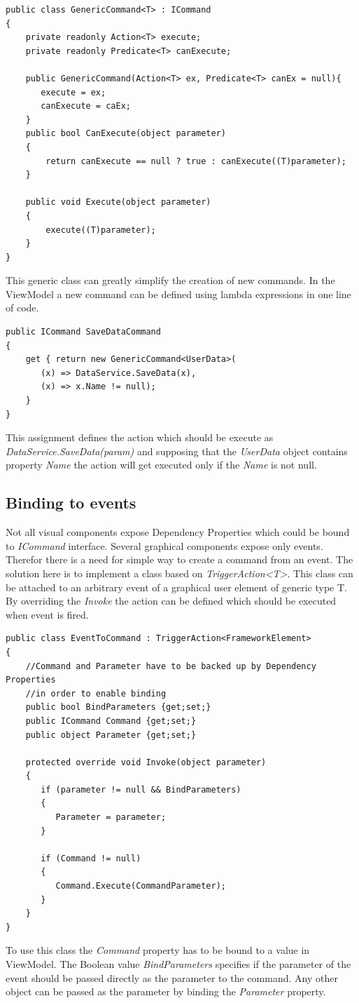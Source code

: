 \begin{verbatim}
public class GenericCommand<T> : ICommand
{
    private readonly Action<T> execute;
    private readonly Predicate<T> canExecute;
    
    public GenericCommand(Action<T> ex, Predicate<T> canEx = null){
       execute = ex;
       canExecute = caEx;
    }
    public bool CanExecute(object parameter)
    {
        return canExecute == null ? true : canExecute((T)parameter);
    }
    
    public void Execute(object parameter)
    {
        execute((T)parameter);
    }
}
\end{verbatim}
This generic class can greatly simplify the creation of new commands. In the ViewModel a new command can be defined using lambda expressions in one line of code.

\begin{verbatim}
public ICommand SaveDataCommand
{
    get { return new GenericCommand<UserData>(
       (x) => DataService.SaveData(x),
       (x) => x.Name != null);
    }
}
\end{verbatim}
This assignment defines the action which should be execute as \textit{DataService.SaveData(param)} and supposing that the \textit{UserData} object contains property \textit{Name} the action will get executed only if the \textit{Name} is not null.

\subsection{Binding to events}
Not all visual components expose Dependency Properties which could be bound to \textit{ICommand} interface. Several graphical components expose only events. Therefor there is a need for simple way to create a command from an event. The solution here is to implement a class based on \textit{TriggerAction<T>}. This class can be attached to an arbitrary event of a graphical user element of generic type T. By overriding the \textit{Invoke} the action can be defined which should be executed when event is fired.

\begin{verbatim}
public class EventToCommand : TriggerAction<FrameworkElement>
{
    //Command and Parameter have to be backed up by Dependency Properties
    //in order to enable binding
    public bool BindParameters {get;set;}
    public ICommand Command {get;set;}
    public object Parameter {get;set;}
    
    protected override void Invoke(object parameter)
    {
       if (parameter != null && BindParameters)
       {
          Parameter = parameter;
       }
       
       if (Command != null)
       {
          Command.Execute(CommandParameter);
       }
    }
}
\end{verbatim}
To use this class the \textit{Command} property has to be bound to a value in ViewModel. The Boolean value \textit{BindParameters} specifies if the parameter of the event should be passed directly as the parameter to the command. Any other object can be passed as the parameter by binding the \textit{Parameter} property.

